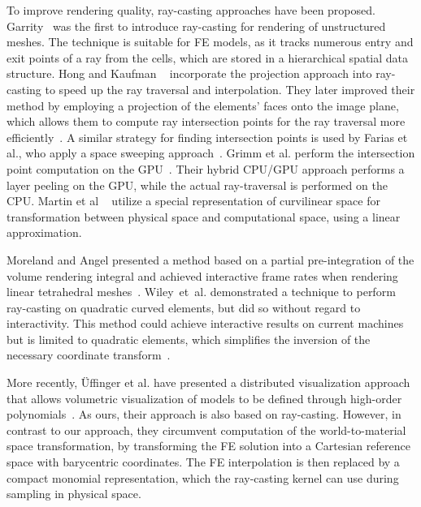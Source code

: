 \documentclass[journal]{vgtc}                %
\newcommand{\todo}[1]{\textbf{\textcolor{blue}{[TODO: {#1}]}}}
\begin{document}
To improve rendering quality, ray-casting approaches have been proposed. Garrity~\cite{garrity90RaytracingIrregular} was the first to introduce ray-casting for rendering of unstructured meshes. The technique is suitable for FE models, as it tracks numerous entry and exit points of a ray from the cells, which are stored in a hierarchical spatial data structure. Hong and Kaufman ~\cite{hong98curvilinear} incorporate the projection approach into ray-casting to speed up the ray traversal and interpolation. They later improved their method by employing a projection of the elements' faces onto the image plane, which allows them to compute ray intersection points for the ray traversal more efficiently~\cite{hong99curvilinear}. A similar strategy for finding intersection points is used by Farias et al., who apply a space sweeping approach~\cite{farias00zsweep}. Grimm et al. perform the intersection point computation on the GPU~\cite{grimm04curvilinear}. Their hybrid CPU/GPU approach performs a layer peeling on the GPU, while the actual ray-traversal is performed on the CPU. Martin et al ~\cite{MartinCurvilinearPacificVIS08} utilize a special representation of curvilinear space for transformation between physical space and computational space, using a linear approximation.

Moreland and Angel presented a method based on a partial pre-integration of the volume rendering integral and achieved interactive frame rates when rendering linear tetrahedral meshes~\cite{morelandVolRen04}. Wiley~et~al. demonstrated a technique to perform ray-casting on quadratic curved elements, but did so without regard to interactivity. This method could achieve interactive results on current machines but is limited to quadratic elements, which simplifies the inversion of the necessary coordinate transform~\cite{wileyraycasting04}.

More recently, {\"U}ffinger et al. have presented a distributed visualization approach that allows volumetric visualization of models to be defined through high-order polynomials~\cite{uffinger10femraycasting}. As ours, their approach is also based on ray-casting. However, in contrast to our approach, they circumvent computation of the world-to-material space transformation, by transforming the FE solution into a Cartesian reference space with barycentric coordinates. The FE interpolation is then replaced by a compact monomial representation, which the ray-casting kernel can use during sampling in physical space.

\end{document}
